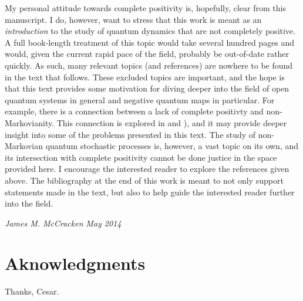 My personal attitude towards complete positivity is, hopefully, clear from this manuscript.  I do, however, want to stress that this work is meant as an {\em introduction} to the study of quantum dynamics that are not completely positive.  A full book-length treatment of this topic would take several hundred pages and would, given the current rapid pace of the field, probably be out-of-date rather quickly.  As such, many relevant topics (and references) are nowhere to be found in the text that follows.  These excluded topics are important, and the hope is that this text provides some motivation for diving deeper into the field of open quantum systems in general and negative quantum maps in particular.  For example, there is a connection between a lack of complete positivty and non-Markovianity.  This connection is explored in \cite{Rodríguez2012} and \cite{Mazzola2012}), and it may provide deeper insight into some of the problems presented in this text.  The study of non-Markovian quantum stochastic processes is, however, a vast topic on its own, and its intersection with complete positivity cannot be done justice in the space provided here.  I encourage the interested reader to explore the references given above.  The bibliography at the end of this work is meant to not only support statements made in the text, but also to help guide the interested reader further into the field.



{\em {\raggedleft James M. McCracken}}
{\em {\raggedleft May 2014}}


\newpage
\chapter*{Aknowledgments}
Thanks, Cesar.

\newpage

